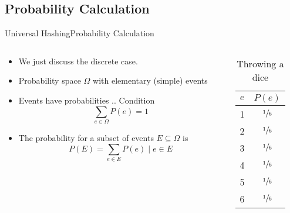 
\subsection{Probability Calculation}
\def\E{\mathbb{E}}
\begin{frame}{Universal Hashing}{Probability Calculation}
  \begin{columns}
    \begin{column}{0.65\textwidth}
      \begin{itemize}
        \item<2->
          We just discuss the discrete case.
        \item<3->
          Probability space {\color{Mittel-Blau}$\Omega$} with {\color{Mittel-Blau}elementary (simple) events}
        \item<4->
          Events have probabilities .. Condition  {\color{Mittel-Blau}\[\sum_{e \in \Omega} P(e) = 1\]}
        \item<5->
          The probability for a subset of events {\color{Mittel-Blau}$E \subseteq \Omega$} is
          {\color{Mittel-Blau}\[P(E) = \sum_{e \in E} P(e) \mid e \in E\]}
      \end{itemize}
    \end{column}
    \begin{column}{0.35\textwidth}
      \begin{table}[!h]
        \caption{Throwing a dice}
        \label{tab:probabilities:rolling_dice}
        \begin{tabularx}{0.5\linewidth}{c|c}
          {\color{Mittel-Blau}$e$} & {\color{Mittel-Blau}$P(e)$}\\
          \midrule
          1 & $\sfrac{1}{6}$\\
          2 & $\sfrac{1}{6}$\\
          3 & $\sfrac{1}{6}$\\
          4 & $\sfrac{1}{6}$\\
          5 & $\sfrac{1}{6}$\\
          6 & $\sfrac{1}{6}$\\
        \end{tabularx}
      \end{table}
    \end{column}
  \end{columns}
\end{frame}

